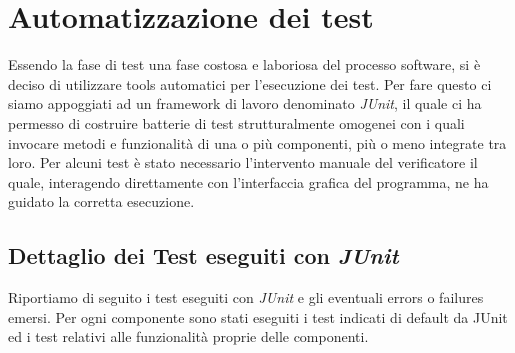 \chapter{Automatizzazione dei test}
Essendo la fase di test una fase costosa e laboriosa del processo software, si \`e deciso di utilizzare tools automatici per l'esecuzione dei test.
Per fare questo ci siamo appoggiati ad un framework di lavoro denominato \textit{JUnit}, il quale ci ha permesso di costruire batterie di test strutturalmente omogenei  con i quali invocare metodi e funzionalit\`a di una o pi\`u componenti, pi\`u o meno integrate tra loro. 
Per alcuni test \`e stato necessario l'intervento manuale del verificatore il quale, interagendo direttamente con l'interfaccia grafica del programma, ne ha guidato la corretta esecuzione.  

\section{Dettaglio dei Test eseguiti con \textit{JUnit}}
Riportiamo di seguito i test eseguiti con \textit{JUnit} e gli eventuali errors o failures emersi.
Per ogni componente sono stati eseguiti i test indicati di default da JUnit ed i test relativi alle funzionalit\`a proprie delle componenti.
